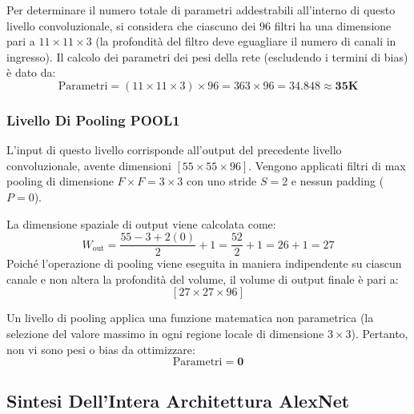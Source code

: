 ﻿\documentclass[11pt, a4paper]{article}
\begin{document}
Per determinare il numero totale di parametri addestrabili all'interno di questo livello convoluzionale, si considera che ciascuno dei $96$ filtri ha una dimensione pari a $11 \times 11 \times 3$ (la profondità del filtro deve eguagliare il numero di canali in ingresso). Il calcolo dei parametri dei pesi della rete (escludendo i termini di bias) è dato da:
\[
\text{Parametri} = (11 \times 11 \times 3) \times 96 = 363 \times 96 = 34.848 \approx \mathbf{35\text{K}}
\]

\subsubsection{Livello Di Pooling POOL1}

L'input di questo livello corrisponde all'output del precedente livello convoluzionale, avente dimensioni $[55 \times 55 \times 96]$.
Vengono applicati filtri di max pooling di dimensione $F \times F = 3 \times 3$ con uno stride $S = 2$ e nessun padding ($P = 0$).

La dimensione spaziale di output viene calcolata come:
\[
W_{\text{out}} = \frac{55 - 3 + 2(0)}{2} + 1 = \frac{52}{2} + 1 = 26 + 1 = 27
\]
Poiché l'operazione di pooling viene eseguita in maniera indipendente su ciascun canale e non altera la profondità del volume, il volume di output finale è pari a:
\[
\boxed{[27 \times 27 \times 96]}
\]

Un livello di pooling applica una funzione matematica non parametrica (la selezione del valore massimo in ogni regione locale di dimensione $3 \times 3$). Pertanto, non vi sono pesi o bias da ottimizzare:
\[
\text{Parametri} = \mathbf{0}
\]

\subsection{Sintesi Dell'Intera Architettura AlexNet}
\end{document}

